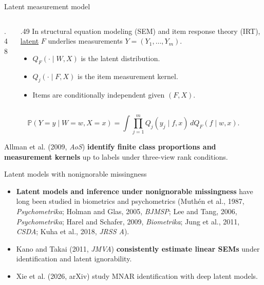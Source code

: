 \documentclass[aspectratio=169,10pt]{beamer}
\newcommand{\slidebody}{\fontsize{10.6pt}{12.6pt}\selectfont}
\renewcommand{\footnotesize}{\slidebody}
\newcommand{\Prb}{\mathbb P}
\newcommand{\term}[1]{\underline{#1}}
\begin{document}
\begin{frame}{Latent measurement model}
\begin{columns}[c,onlytextwidth]
\begin{column}{.48\textwidth}
\centering

\end{column}
\begin{column}{.49\textwidth}
In structural equation modeling (SEM) and item response theory (IRT), \term{latent} $F$ underlies measurements $Y=(Y_1,\ldots,Y_m)$.
\begin{itemize}
  \item $Q_F(\cdot\mid W,X)$ is the latent distribution.
  \item $Q_j(\cdot\mid F,X)$ is the item measurement kernel.
  \item Items are conditionally independent given $(F,X)$.
\end{itemize}
\end{column}
\end{columns}
\vspace{.2em}
\[
\Prb(Y=y\mid W=w,X=x)
=\int\prod_{j=1}^m Q_j(y_j\mid f,x)\,dQ_F(f\mid w,x).
\]
{\footnotesize
Allman et al. (2009, \emph{AoS}) \textbf{identify finite class proportions and measurement kernels} up to labels under three-view rank conditions.\par
}
\end{frame}

\begin{frame}{Latent models with nonignorable missingness}
\begin{itemize}
\item
\textbf{Latent models and inference under nonignorable missingness} have long been studied in biometrics and psychometrics (Muth\'en et al., 1987, \emph{Psychometrika}; Holman and Glas, 2005, \emph{BJMSP}; Lee and Tang, 2006, \emph{Psychometrika}; Harel and Schafer, 2009, \emph{Biometrika}; Jung et al., 2011, \emph{CSDA}; Kuha et al., 2018, \emph{JRSS A}).\par
\item Kano and Takai (2011, \emph{JMVA}) \textbf{consistently estimate linear SEMs} under identification and latent ignorability.
\item Xie et al. (2026, arXiv) study MNAR identification with deep latent models.
\end{itemize}
\end{frame}
\end{document}
